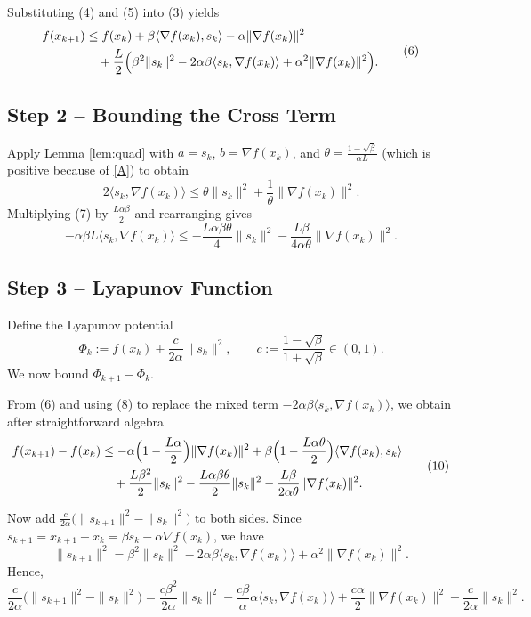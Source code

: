 \documentclass{article}
\begin{document}
Substituting (4) and (5) into (3) yields
\[
\begin{aligned}
f(x_{k+1})
&\le f(x_{k})
+\beta\langle\nabla f(x_{k}),s_{k}\rangle-\alpha\|\nabla f(x_{k})\|^{2}\\
&\quad+\frac{L}{2}\Bigl(\beta^{2}\|s_{k}\|^{2}-2\alpha\beta\langle s_{k},\nabla f(x_{k})\rangle+\alpha^{2}\|\nabla f(x_{k})\|^{2}\Bigr).
\end{aligned}
\tag{6}
\]

\subsection*{Step 2 – Bounding the Cross Term}
Apply Lemma \ref{lem:quad} with $a=s_{k}$, $b=\nabla f(x_{k})$, and $\theta=\frac{1-\sqrt{\beta}}{\alpha L}$ (which is positive because of \eqref{A}) to obtain
\[
2\langle s_{k},\nabla f(x_{k})\rangle
\le \theta\|s_{k}\|^{2}+\frac{1}{\theta}\|\nabla f(x_{k})\|^{2}.
\tag{7}
\]
Multiplying (7) by $\frac{L\alpha\beta}{2}$ and rearranging gives
\[
-\alpha\beta L\langle s_{k},\nabla f(x_{k})\rangle
\le -\frac{L\alpha\beta\theta}{4}\|s_{k}\|^{2}
-\frac{L\beta}{4\alpha\theta}\|\nabla f(x_{k})\|^{2}. \tag{8}
\]

\subsection*{Step 3 – Lyapunov Function}
Define the Lyapunov potential
\[
\Phi_{k}:=f(x_{k})+\frac{c}{2\alpha}\|s_{k}\|^{2},
\qquad c:=\frac{1-\sqrt{\beta}}{1+\sqrt{\beta}}\in(0,1). \tag{9}
\]
We now bound $\Phi_{k+1}-\Phi_{k}$.

From (6) and using (8) to replace the mixed term $-2\alpha\beta\langle s_{k},\nabla f(x_{k})\rangle$, we obtain after straightforward algebra
\[
\begin{aligned}
f(x_{k+1})-f(x_{k})
&\le -\alpha\Bigl(1-\frac{L\alpha}{2}\Bigr)\|\nabla f(x_{k})\|^{2}
+\beta\Bigl(1-\frac{L\alpha\theta}{2}\Bigr)\langle\nabla f(x_{k}),s_{k}\rangle\\
&\quad+\frac{L\beta^{2}}{2}\|s_{k}\|^{2}
-\frac{L\alpha\beta\theta}{2}\|s_{k}\|^{2}
-\frac{L\beta}{2\alpha\theta}\|\nabla f(x_{k})\|^{2}.
\end{aligned}
\tag{10}
\]

Now add $\frac{c}{2\alpha}\bigl(\|s_{k+1}\|^{2}-\|s_{k}\|^{2}\bigr)$ to both sides.  
Since $s_{k+1}=x_{k+1}-x_{k}= \beta s_{k}-\alpha\nabla f(x_{k})$, we have
\[
\|s_{k+1}\|^{2}
= \beta^{2}\|s_{k}\|^{2}-2\alpha\beta\langle s_{k},\nabla f(x_{k})\rangle+\alpha^{2}\|\nabla f(x_{k})\|^{2}.
\tag{11}
\]
Hence,
\[
\frac{c}{2\alpha}\bigl(\|s_{k+1}\|^{2}-\|s_{k}\|^{2}\bigr)
= \frac{c\beta^{2}}{2\alpha}\|s_{k}\|^{2}
-\frac{c\beta}{\alpha}\alpha\langle s_{k},\nabla f(x_{k})\rangle
+\frac{c\alpha}{2}\|\nabla f(x_{k})\|^{2}
-\frac{c}{2\alpha}\|s_{k}\|^{2}.
\tag{12}
\]
\end{document}
